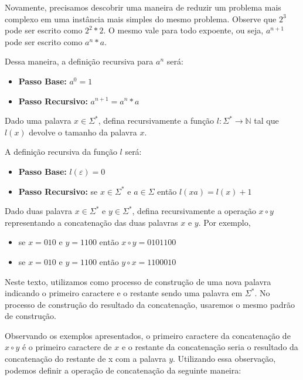 Novamente, precisamos descobrir uma maneira de reduzir um problema mais complexo em uma instância mais simples do mesmo problema. Observe que $2^3$ pode ser escrito como $2^2 * 2$. O mesmo vale para todo expoente, ou seja, $a^{n+1}$ pode ser escrito como $a^{n}*a$.



Dessa maneira, a definição recursiva para $a^n$ será:

\begin{itemize}
    \item \textbf{Passo Base:} $a^0 = 1$
    \item \textbf{Passo Recursivo:} $a^{n+1} = a^{n} * a$
\end{itemize}


\begin{exemplo}
Dado uma palavra $x \in \Sigma^*$, defina recursivamente a função $l : \Sigma^* \to \mathbb{N}$ tal que $l(x)$ devolve o tamanho da palavra $x$.
\end{exemplo}


A definição recursiva da função $l$ será:

\begin{itemize}
    \item \textbf{Passo Base:} $l(\varepsilon) = 0$
    \item \textbf{Passo Recursivo:} se $x \in \Sigma^*$ e $a \in \Sigma$ então $l(xa) = l(x) + 1$
\end{itemize}


\begin{exemplo}
Dado duas palavra $x \in \Sigma^*$ e $y \in \Sigma^*$, defina recursivamente a operação $x \circ y$ representando a concatenação das duas palavras $x$ e $y$. Por exemplo,

\begin{itemize}
    \item se $x = 010$ e $y = 1100$ então $x \circ y = 0101100$
    \item se $x = 010$ e $y = 1100$ então $y \circ x = 1100010$
\end{itemize}

\end{exemplo}


Neste texto, utilizamos como processo de construção de uma nova palavra indicando o primeiro caractere e o restante sendo uma palavra em $\Sigma^*$. No processo de construção do resultado da concatenação, usaremos o mesmo padrão de construção.

Observando os exemplos apresentados, o primeiro caractere da concatenação de $x \circ y$ é o primeiro caractere de $x$ e o restante da concatenação seria o resultado da concatenação do restante de x com a palavra $y$. Utilizando essa observação, podemos definir a operação de concatenação da seguinte maneira:

